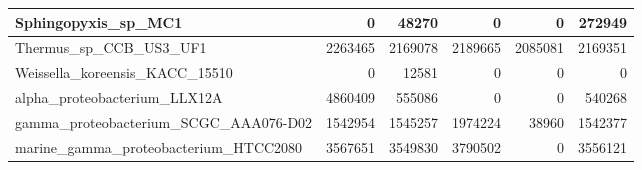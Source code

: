 \documentclass[12pt,a4paper]{article}
\begin{document}
\begin{table}[ht]
\begin{center}
\begin{tabular}{|l*{5}{|r}|}
Sphingopyxis\_sp\_MC1 & 0 & 48270 & 0 & 0 & 272949 \\ \hline
Thermus\_sp\_CCB\_US3\_UF1 & 2263465 & 2169078 & 2189665 & 2085081 & 2169351 \\ \hline
Weissella\_koreensis\_KACC\_15510 & 0 & 12581 & 0 & 0 & 0 \\ \hline
alpha\_proteobacterium\_LLX12A & 4860409 & 555086 & 0 & 0 & 540268 \\ \hline
gamma\_proteobacterium\_SCGC\_AAA076-D02 & 1542954 & 1545257 & 1974224 & 38960 & 1542377 \\ \hline
marine\_gamma\_proteobacterium\_HTCC2080 & 3567651 & 3549830 & 3790502 & 0 & 3556121 \\ \hline
\end{tabular}
\end{center}
\end{table}
\end{document}

